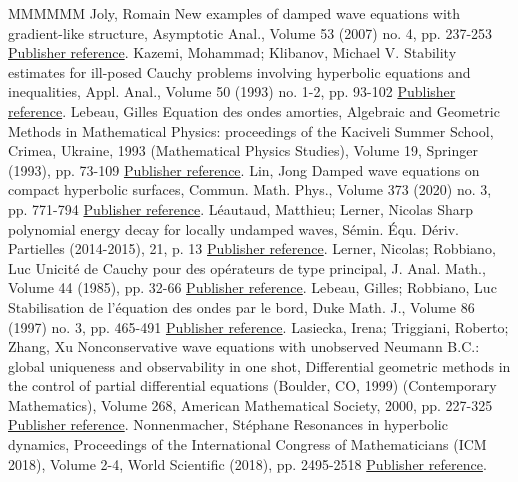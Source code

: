 \documentclass[11pt]{article}
\theoremstyle{definition}
\numberwithin{equation}{section}
\numberwithin{figure}{section}
\numberwithin{table}{section}
\begin{document}
\begin{thebibliography}{MMMMMM}
 Joly, Romain New examples of damped wave equations with gradient-like structure, Asymptotic Anal., Volume 53 (2007) no. 4, pp. 237-253 \href{https://ahl.centre-mersenne.org/item/AHL_2020__3__1241_0/#RJ}{Publisher reference}.
 Kazemi, Mohammad; Klibanov, Michael V. Stability estimates for ill-posed Cauchy problems involving hyperbolic equations and inequalities, Appl. Anal., Volume 50 (1993) no. 1-2, pp. 93-102 \href{https://ahl.centre-mersenne.org/item/AHL_2020__3__1241_0/#K-K}{Publisher reference}.
 Lebeau, Gilles Equation des ondes amorties, Algebraic and Geometric Methods in Mathematical Physics: proceedings of the Kaciveli Summer School, Crimea, Ukraine, 1993 (Mathematical Physics Studies), Volume 19, Springer (1993), pp. 73-109 \href{https://ahl.centre-mersenne.org/item/AHL_2020__3__1241_0/#Lebeau}{Publisher reference}.
 Lin, Jong Damped wave equations on compact hyperbolic surfaces, Commun. Math. Phys., Volume 373 (2020) no. 3, pp. 771-794 \href{https://ahl.centre-mersenne.org/item/AHL_2020__3__1241_0/#Lin}{Publisher reference}.
 Léautaud, Matthieu; Lerner, Nicolas Sharp polynomial energy decay for locally undamped waves, Sémin. Équ. Dériv. Partielles (2014-2015), 21, p. 13 \href{https://ahl.centre-mersenne.org/item/AHL_2020__3__1241_0/#Leautaud-Lerner}{Publisher reference}.
 Lerner, Nicolas; Robbiano, Luc Unicité de Cauchy pour des opérateurs de type principal, J. Anal. Math., Volume 44 (1985), pp. 32-66 \href{https://ahl.centre-mersenne.org/item/AHL_2020__3__1241_0/#LR}{Publisher reference}.
 Lebeau, Gilles; Robbiano, Luc Stabilisation de l’équation des ondes par le bord, Duke Math. J., Volume 86 (1997) no. 3, pp. 465-491 \href{https://ahl.centre-mersenne.org/item/AHL_2020__3__1241_0/#Lebeau-Robbiano}{Publisher reference}.
 Lasiecka, Irena; Triggiani, Roberto; Zhang, Xu Nonconservative wave equations with unobserved Neumann B.C.: global uniqueness and observability in one shot, Differential geometric methods in the control of partial differential equations (Boulder, CO, 1999) (Contemporary Mathematics), Volume 268, American Mathematical Society, 2000, pp. 227-325 \href{https://ahl.centre-mersenne.org/item/AHL_2020__3__1241_0/#Las-Tri-Zha}{Publisher reference}.
 Nonnenmacher, Stéphane Resonances in hyperbolic dynamics, Proceedings of the International Congress of Mathematicians (ICM 2018), Volume 2-4, World Scientific (2018), pp. 2495-2518 \href{https://ahl.centre-mersenne.org/item/AHL_2020__3__1241_0/#NonenmacherICM}{Publisher reference}.

\end{thebibliography}
\end{document}
